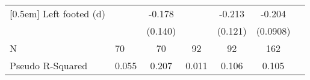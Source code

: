 {\begin{tabularx}{0.9\textwidth}{Xl*{5}{c}}
[0.5em]
Left footed (d)     &                     &      -0.178         &                     &      -0.213\sym{*}  &      -0.204\sym{**} \\
                    &                     &     (0.140)         &                     &     (0.121)         &    (0.0908)         \\
\hline
N                   &          70         &          70         &          92         &          92         &         162         \\
Pseudo R-Squared    &       0.055         &       0.207         &       0.011         &       0.106         &       0.105         \\
\hline\hline
\end{tabularx}
}
